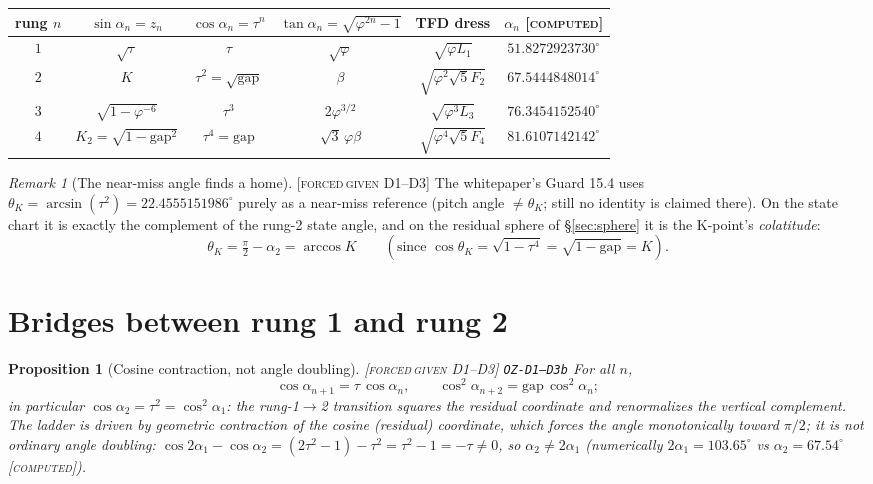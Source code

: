 \documentclass[11pt]{article}
\newcommand{\tagFD}{\textcolor{cF}{\textsc{[forced}}\,\textcolor{cD}{\textsc{given D1--D3]}}}
\newcommand{\tagC}{\textcolor{cC}{\textsc{[computed]}}}
\newcommand{\hx}[1]{\textcolor{cC}{\footnotesize\texttt{#1}}}
\newcommand{\gp}{\varphi}
\newcommand{\gapc}{\mathrm{gap}}
\theoremstyle{plain}
\newtheorem{proposition}[theorem]{Proposition}
\theoremstyle{definition}
\theoremstyle{remark}
\newtheorem{remark}[theorem]{Remark}
\begin{document}
\begin{center}\small
\begin{tabular}{@{}cccccc@{}}
\toprule
rung $n$ & $\sin\alpha_n=z_n$ & $\cos\alpha_n=\tau^n$ & $\tan\alpha_n=\sqrt{\gp^{2n}-1}$ & TFD dress & $\alpha_n$ \tagC{}\\
\midrule
$1$ & $\sqrt\tau$ & $\tau$ & $\sqrt\gp$ & $\sqrt{\gp L_1}$ & $51.8272923730^\circ$\\
$2$ & $K$ & $\tau^2=\sqrt{\gapc}$ & $\beta$ & $\sqrt{\gp^2\sqrt5F_2}$ & $67.5444848014^\circ$\\
$3$ & $\sqrt{1-\gp^{-6}}$ & $\tau^3$ & $2\gp^{3/2}$ & $\sqrt{\gp^3L_3}$ & $76.3454152540^\circ$\\
$4$ & $K_2=\sqrt{1-\gapc^2}$ & $\tau^4=\gapc$ & $\sqrt3\,\gp\beta$ & $\sqrt{\gp^4\sqrt5F_4}$ & $81.6107142142^\circ$\\
\bottomrule
\end{tabular}
\end{center}

\begin{remark}[The near-miss angle finds a home]\label{rem:thetaK}\tagFD{}
The whitepaper's Guard 15.4 uses $\theta_K=\arcsin(\tau^2)=22.4555151986^\circ$
purely as a near-miss reference (pitch angle $\neq\theta_K$; still no identity is
claimed there). On the state chart it is exactly the complement of the rung-2
state angle, and on the residual sphere of \S\ref{sec:sphere} it is the K-point's
\emph{colatitude}:
\[
\theta_K=\tfrac\pi2-\alpha_2=\arccos K
\qquad(\text{since }\cos\theta_K=\sqrt{1-\tau^4}=\sqrt{1-\gapc}=K).
\]
\end{remark}

\section{Bridges between rung 1 and rung 2}\label{sec:bridges}

\begin{proposition}[Cosine contraction, not angle doubling]\label{prop:contraction}\tagFD{} \hx{OZ-D1--D3b}
For all $n$,
\[
\cos\alpha_{n+1}=\tau\,\cos\alpha_n,
\qquad
\cos^2\alpha_{n+2}=\gapc\,\cos^2\alpha_n ;
\]
in particular $\cos\alpha_2=\tau^2=\cos^2\alpha_1$: the rung-1$\to$2
transition squares the residual coordinate and renormalizes the vertical
complement. The ladder is driven by geometric contraction of the cosine
(residual) coordinate, which forces the angle monotonically toward $\pi/2$; it is \emph{not} ordinary angle doubling:
$\cos2\alpha_1-\cos\alpha_2=(2\tau^2-1)-\tau^2=\tau^2-1=-\tau\neq0$, so
$\alpha_2\neq2\alpha_1$ (numerically $2\alpha_1=103.65^\circ$ vs
$\alpha_2=67.54^\circ$ \tagC{}).
\end{proposition}
\end{document}
